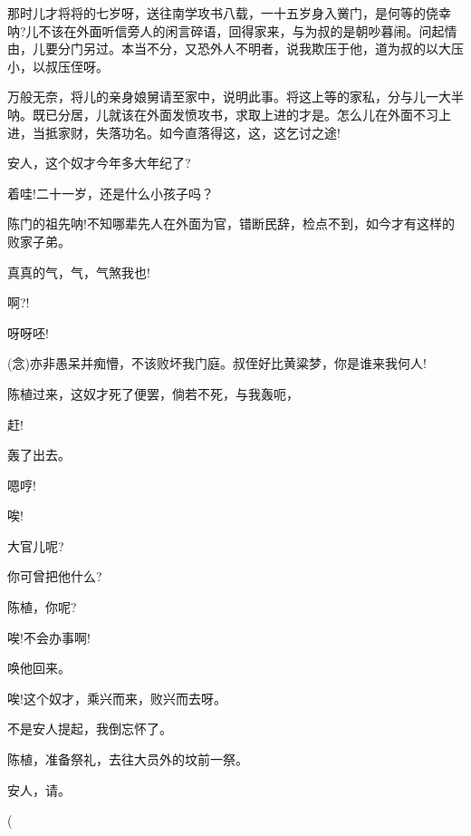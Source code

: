 {那时儿才将将的七岁呀，送往南学攻书八载，一十五岁身入黉门，是何等的侥幸呐?儿不该在外面听信旁人的闲言碎语，回得家来，与为叔的是朝吵暮闹。问起情由，儿要分门另过。本当不分，又恐外人不明者，说我欺压于他，道为叔的以大压小，以叔压侄呀。

万般无奈，将儿的亲身娘舅请至家中，说明此事。将这上等的家私，分与儿一大半呐。既已分居，儿就该在外面发愤攻书，求取上进的才是。怎么儿在外面不习上进，当抵家财，失落功名。如今直落得这，这，这乞讨之途!

安人，这个奴才今年多大年纪了?

着哇!二十一岁，还是什么小孩子吗？

陈门的祖先呐!不知哪辈先人在外面为官，错断民辞，检点不到，如今才有这样的败家子弟。

真真的气，气，气煞我也!

啊?!

呀呀呸!

({\akai 念})亦非愚呆并痴懵，不该败坏我门庭。叔侄好比黄粱梦，你是谁来我何人!

陈植过来，这奴才死了便罢，倘若不死，与我轰呃，

赶!

轰了出去。

嗯哼!


唉!


大官儿呢?

你可曾把他什么?

陈植，你呢?

唉!不会办事啊!

唤他回来。

唉!这个奴才，乘兴而来，败兴而去呀。

不是安人提起，我倒忘怀了。

陈植，准备祭礼，去往大员外的坟前一祭。

安人，请。


(


}
